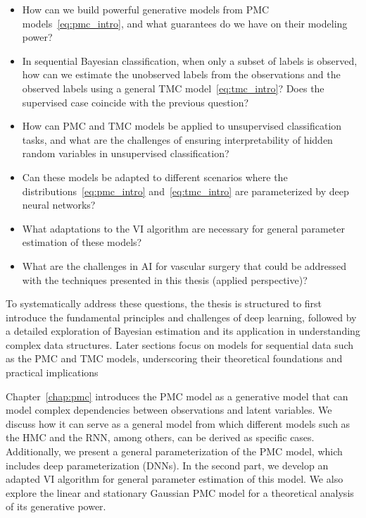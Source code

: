 


\begin{itemize}
    \item How can we build powerful generative models from PMC
    models~\eqref{eq:pmc_intro}, 
    and what guarantees do we have on their modeling power?    
    \item In sequential Bayesian classification, when only a subset of
    labels is observed, how can we estimate the unobserved labels from the
    observations and the observed labels using a general TMC model~\eqref{eq:tmc_intro}? 
    Does the
    supervised case coincide with the previous question?
    \item How can PMC and TMC models be applied to unsupervised classification
    tasks, and what are the challenges of ensuring interpretability of hidden random
    variables in unsupervised classification?
    \item Can these models be adapted to different scenarios
    where the distributions~\eqref{eq:pmc_intro} and~\eqref{eq:tmc_intro}  
    are parameterized by deep neural networks?
    \item What adaptations to the VI algorithm are necessary for 
    general parameter estimation of these models?
    \item What are the challenges in AI for vascular surgery that could be addressed
    with the techniques presented in this thesis (applied
    perspective)?
\end{itemize}

To systematically address these questions, the thesis is structured to first
introduce the fundamental principles and challenges of deep learning, 
 followed by a detailed exploration of Bayesian
estimation and its application in understanding complex data structures. Later
sections focus on models for sequential data such as the PMC and TMC models,
underscoring their theoretical foundations and practical implications


Chapter~\ref{chap:pmc} 
introduces the PMC model as a generative model that can model complex
dependencies between observations and latent variables. We discuss how it can
serve as a general model from which different models such as the HMC and the RNN,
among others, can be derived as specific cases. Additionally, we present a
general parameterization of the PMC model, which includes deep parameterization
(DNNs). In the second part, we develop an adapted VI algorithm for general
parameter estimation of this model. We also explore the linear and stationary
Gaussian PMC model for a theoretical analysis of its generative power.



